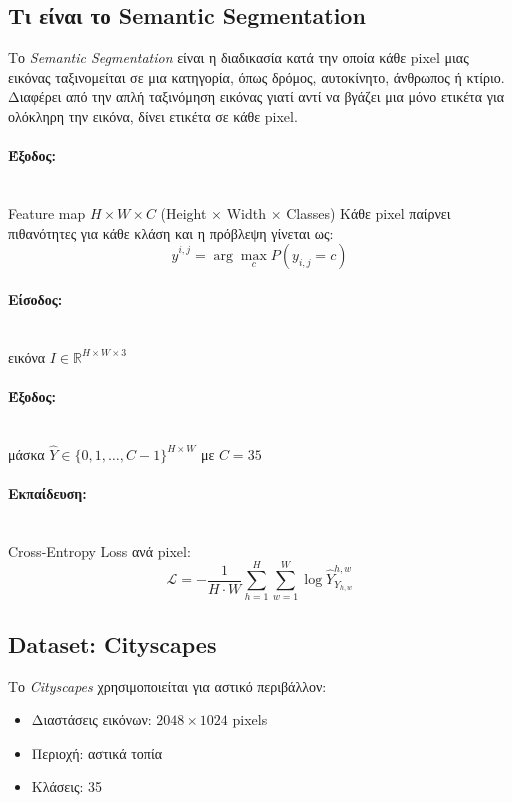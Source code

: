 \documentclass[12pt]{article}
\begin{document}
    \subsection{Τι είναι το Semantic Segmentation}
    Το \textit{Semantic Segmentation} είναι η διαδικασία κατά την οποία κάθε pixel μιας εικόνας ταξινομείται σε μια κατηγορία, όπως δρόμος, αυτοκίνητο, άνθρωπος ή κτίριο.  
    Διαφέρει από την απλή ταξινόμηση εικόνας γιατί αντί να βγάζει μια μόνο ετικέτα για ολόκληρη την εικόνα, δίνει ετικέτα σε κάθε pixel.
    
    \paragraph{Έξοδος:}   \mbox{}\\Feature map \(H \times W \times C\) (Height × Width × Classes)  
    Κάθε pixel παίρνει πιθανότητες για κάθε κλάση και η πρόβλεψη γίνεται ως:
    \[
    \hat{y}^{i,j} = \arg\max_c P(y_{i,j} = c)
    \]
    
    \paragraph{Είσοδος:}   \mbox{}\\εικόνα \(I \in \mathbb{R}^{H \times W \times 3}\)  
    \paragraph{Έξοδος:}   \mbox{}\\μάσκα \(\hat{Y} \in \{0,1,\dots,C-1\}^{H \times W}\) με \(C=35\)
    
    \paragraph{Εκπαίδευση:}  \mbox{}\\ Cross-Entropy Loss ανά pixel:
    \[
    \mathcal{L} = - \frac{1}{H \cdot W} \sum_{h=1}^{H} \sum_{w=1}^{W} \log \hat{Y}^{h,w}_{Y_{h,w}}
    \]
    
    \subsection{Dataset: Cityscapes}
    Το \textit{Cityscapes} χρησιμοποιείται για αστικό περιβάλλον:
    \begin{itemize}
        \item Διαστάσεις εικόνων: \(2048 \times 1024\) pixels
        \item Περιοχή: αστικά τοπία
        \item Κλάσεις: 35 
    \end{itemize}
    
\end{document}
